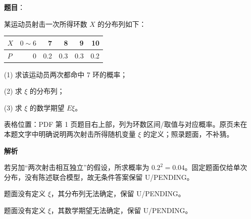 \begin{answer}

\textbf{题目}：

某运动员射击一次所得环数 \(X\) 的分布列如下：

\begin{center}
\begin{tabular}{lrrrrr}
\toprule
\(X\) & \(0\sim6\) & 7 & 8 & 9 & 10 \\
\midrule
\(P\) & 0 & 0.2 & 0.3 & 0.3 & 0.2 \\
\bottomrule
\end{tabular}
\end{center}

(1) 求该运动员两次都命中 7 环的概率；

(2) 求 \(\xi\) 的分布列；

(3) 求 \(\xi\) 的数学期望 \(E\xi\)。

\begin{gktip}
表格位置：PDF 第 1 页题目右上部，列为环数区间/取值与对应概率。原页未在本题文字中明确说明两次射击所得随机变量 \(\xi\) 的定义；照录题面，不补猜。
\end{gktip}

\textbf{解析}


若另加“两次射击相互独立”的假设，所求概率为 $0.2^2=0.04$。固定题面仅给单次分布，没有陈述联合模型，故无条件答案保留 U/PENDING。


题面没有定义 $\xi$，其分布列无法确定，保留 U/PENDING。


题面没有定义 $\xi$，其数学期望无法确定，保留 U/PENDING。




\end{answer}
